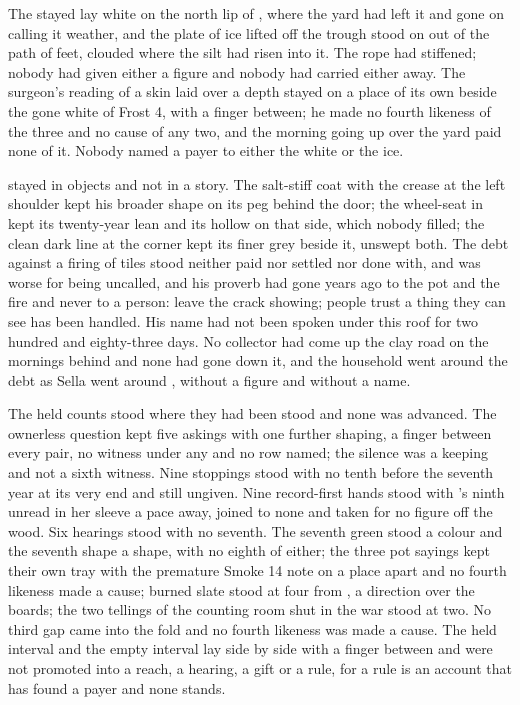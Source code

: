 The stayed  lay white on the north lip of , where the yard had left it and gone on calling it weather, and the plate of ice lifted off the trough stood on  out of the path of feet, clouded where the silt had risen into it. The rope had stiffened; nobody had given either a figure and nobody had carried either away. The surgeon's reading of a skin laid over a depth stayed on a place of its own beside the gone white of Frost 4, with a finger between; he made no fourth likeness of the three and no cause of any two, and the morning going up over the yard paid none of it. Nobody named a payer to either the white or the ice.

 stayed in objects and not in a story. The salt-stiff coat with the crease at the left shoulder kept his broader shape on its peg behind the door; the wheel-seat in  kept its twenty-year lean and its hollow on that side, which nobody filled; the clean dark line at the corner kept its finer grey beside it, unswept both. The debt against a firing of tiles stood neither paid nor settled nor done with, and was worse for being uncalled, and his proverb had gone years ago to the pot and the fire and never to a person: leave the crack showing; people trust a thing they can see has been handled. His name had not been spoken under this roof for two hundred and eighty-three days. No collector had come up the clay road on the mornings behind and none had gone down it, and the household went around the debt as Sella went around , without a figure and without a name.

The held counts stood where they had been stood and none was advanced. The ownerless question kept five askings with one further shaping, a finger between every pair, no witness under any and no row named; the silence was a keeping and not a sixth witness. Nine stoppings stood with no tenth before the seventh year at its very end and still ungiven. Nine record-first hands stood with 's ninth unread in her sleeve a pace away, joined to none and taken for no figure off the wood. Six hearings stood with no seventh. The seventh green stood a colour and the seventh shape a shape, with no eighth of either; the three pot sayings kept their own tray with the premature Smoke 14 note on a place apart and no fourth likeness made a cause; burned slate stood at four from , a direction over the boards; the two tellings of the counting room shut in the war stood at two. No third gap came into the fold and no fourth likeness was made a cause. The held interval and the empty interval lay side by side with a finger between and were not promoted into a reach, a hearing, a gift or a rule, for a rule is an account that has found a payer and none stands.

